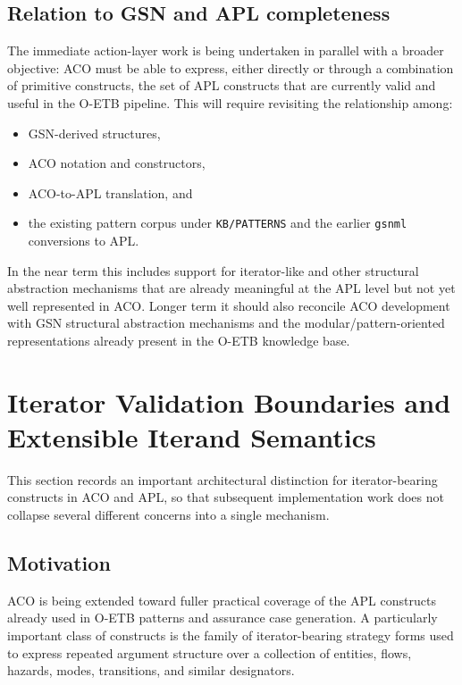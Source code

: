 \documentclass[12pt,twoside,a4paper]{article}
\begin{document}
\subsection{Relation to GSN and APL completeness}

The immediate action-layer work is being undertaken in parallel with a broader objective: ACO must be able to express, either directly or through a combination of primitive constructs, the set of APL constructs that are currently valid and useful in the O-ETB pipeline.
This will require revisiting the relationship among:
\begin{itemize}
  \item GSN-derived structures,
  \item ACO notation and constructors,
  \item ACO-to-APL translation, and
  \item the existing pattern corpus under \texttt{KB/PATTERNS} and the earlier \texttt{gsnml} conversions to APL.
\end{itemize}
In the near term this includes support for iterator-like and other structural abstraction mechanisms that are already meaningful at the APL level but not yet well represented in ACO.
Longer term it should also reconcile ACO development with GSN structural abstraction mechanisms and the modular/pattern-oriented representations already present in the O-ETB knowledge base.

\section{Iterator Validation Boundaries and Extensible Iterand Semantics}
\label{sec:iterator-validation-boundaries}

This section records an important architectural distinction for iterator-bearing constructs in ACO and APL, so that subsequent implementation work does not collapse several different concerns into a single mechanism.

\subsection{Motivation}

ACO is being extended toward fuller practical coverage of the APL constructs already used in O-ETB patterns and assurance case generation.
A particularly important class of constructs is the family of iterator-bearing strategy forms used to express repeated argument structure over a collection of entities, flows, hazards, modes, transitions, and similar designators.
\end{document}

